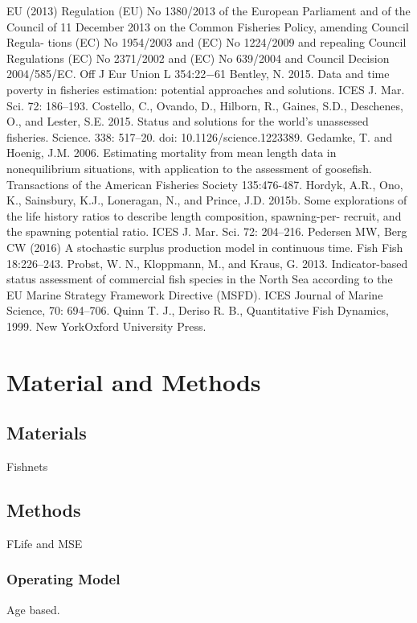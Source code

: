\documentclass[preprint,12pt]{elsarticle}
\begin{document}
EU (2013) Regulation (EU) No 1380/2013 of the European Parliament and of the Council of 11 December 2013 on the Common Fisheries Policy, amending Council Regula- tions (EC) No 1954/2003 and (EC) No 1224/2009 and repealing Council Regulations (EC) No 2371/2002 and (EC) No 639/2004 and Council Decision 2004/585/EC. Off J Eur Union L 354:22−61
Bentley, N. 2015. Data and time poverty in fisheries estimation: potential approaches and solutions. ICES J. Mar. Sci. 72: 186–193.
Costello, C., Ovando, D., Hilborn, R., Gaines, S.D., Deschenes, O., and Lester, S.E. 2015. Status and solutions for the world’s unassessed fisheries. Science. 338: 517–20. doi: 10.1126/science.1223389.
Gedamke, T. and Hoenig, J.M. 2006. Estimating mortality from mean length data in nonequilibrium situations, with application to the assessment of goosefish. Transactions of the American Fisheries Society 135:476-487.
Hordyk, A.R., Ono, K., Sainsbury, K.J., Loneragan, N., and Prince, J.D. 2015b. Some explorations of the life history ratios to describe length composition, spawning-per- recruit, and the spawning potential ratio. ICES J. Mar. Sci. 72: 204–216.
Pedersen MW, Berg CW (2016) A stochastic surplus production model in continuous time. Fish Fish 18:226–243.
Probst, W. N., Kloppmann, M., and Kraus, G. 2013. Indicator-based status assessment of commercial fish species in the North Sea according to the EU Marine Strategy Framework Directive (MSFD). ICES Journal of Marine Science, 70: 694–706.
Quinn T. J., Deriso R. B., Quantitative Fish Dynamics, 1999. New YorkOxford University Press.

\section{Material and Methods}
\subsection{Materials}

Fishnets

\subsection{Methods}

FLife and MSE

\subsubsection{Operating Model}

Age based.
\end{document}
